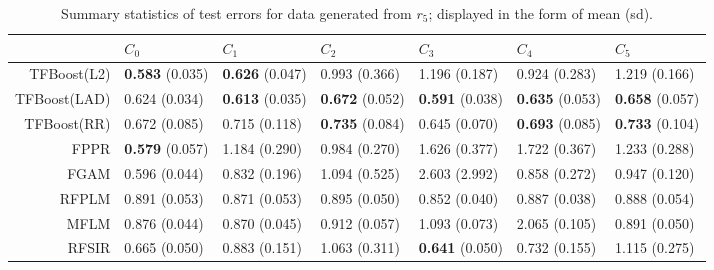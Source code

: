 \begin{table}[H]
\centering
\footnotesize
\begin{tabular}{rllllll}
  \hline
 & $C_0$ & $C_1$ & $C_2$ & $C_3$ & $C_4$ & $C_5$ \\ 
  \hline
TFBoost(L2) & \textbf{0.583} (0.035) & \textbf{0.626} (0.047) & 0.993 (0.366) & 1.196 (0.187) & 0.924 (0.283) & 1.219 (0.166) \\ 
  TFBoost(LAD) & 0.624 (0.034) & \textbf{0.613} (0.035) & \textbf{0.672} (0.052) & \textbf{0.591} (0.038) & \textbf{0.635} (0.053) & \textbf{0.658} (0.057) \\ 
  TFBoost(RR) & 0.672 (0.085) & 0.715 (0.118) & \textbf{0.735} (0.084) & 0.645 (0.070) & \textbf{0.693} (0.085) & \textbf{0.733} (0.104) \\ 
  FPPR & \textbf{0.579} (0.057) & 1.184 (0.290) & 0.984 (0.270) & 1.626 (0.377) & 1.722 (0.367) & 1.233 (0.288) \\ 
  FGAM & 0.596 (0.044) & 0.832 (0.196) & 1.094 (0.525) & 2.603 (2.992) & 0.858 (0.272) & 0.947 (0.120) \\ 
  RFPLM & 0.891 (0.053) & 0.871 (0.053) & 0.895 (0.050) & 0.852 (0.040) & 0.887 (0.038) & 0.888 (0.054) \\ 
  MFLM & 0.876 (0.044) & 0.870 (0.045) & 0.912 (0.057) & 1.093 (0.073) & 2.065 (0.105) & 0.891 (0.050) \\ 
  RFSIR & 0.665 (0.050) & 0.883 (0.151) & 1.063 (0.311) & \textbf{0.641} (0.050) & 0.732 (0.155) & 1.115 (0.275) \\ 
   \hline
\end{tabular}
\caption{Summary statistics of test errors for data generated from $r_5$; displayed in the form of mean (sd).} 
\end{table}
